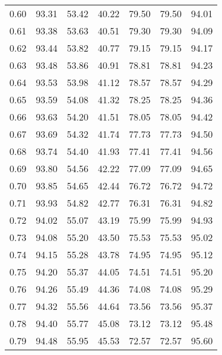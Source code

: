 \begin{tabular}{|c|c|c|c|c|c|c|}
      0.60 &     93.31 &     53.42 &      40.22 &   79.50 &      79.50 &         94.01 \\
      0.61 &     93.38 &     53.63 &      40.51 &   79.30 &      79.30 &         94.09 \\
      0.62 &     93.44 &     53.82 &      40.77 &   79.15 &      79.15 &         94.17 \\
      0.63 &     93.48 &     53.86 &      40.91 &   78.81 &      78.81 &         94.23 \\
      0.64 &     93.53 &     53.98 &      41.12 &   78.57 &      78.57 &         94.29 \\
      0.65 &     93.59 &     54.08 &      41.32 &   78.25 &      78.25 &         94.36 \\
      0.66 &     93.63 &     54.20 &      41.51 &   78.05 &      78.05 &         94.42 \\
      0.67 &     93.69 &     54.32 &      41.74 &   77.73 &      77.73 &         94.50 \\
      0.68 &     93.74 &     54.40 &      41.93 &   77.41 &      77.41 &         94.56 \\
      0.69 &     93.80 &     54.56 &      42.22 &   77.09 &      77.09 &         94.65 \\
      0.70 &     93.85 &     54.65 &      42.44 &   76.72 &      76.72 &         94.72 \\
      0.71 &     93.93 &     54.82 &      42.77 &   76.31 &      76.31 &         94.82 \\
      0.72 &     94.02 &     55.07 &      43.19 &   75.99 &      75.99 &         94.93 \\
      0.73 &     94.08 &     55.20 &      43.50 &   75.53 &      75.53 &         95.02 \\
      0.74 &     94.15 &     55.28 &      43.78 &   74.95 &      74.95 &         95.12 \\
      0.75 &     94.20 &     55.37 &      44.05 &   74.51 &      74.51 &         95.20 \\
      0.76 &     94.26 &     55.49 &      44.36 &   74.08 &      74.08 &         95.29 \\
      0.77 &     94.32 &     55.56 &      44.64 &   73.56 &      73.56 &         95.37 \\
      0.78 &     94.40 &     55.77 &      45.08 &   73.12 &      73.12 &         95.48 \\
      0.79 &     94.48 &     55.95 &      45.53 &   72.57 &      72.57 &         95.60 \\

\end{tabular}
